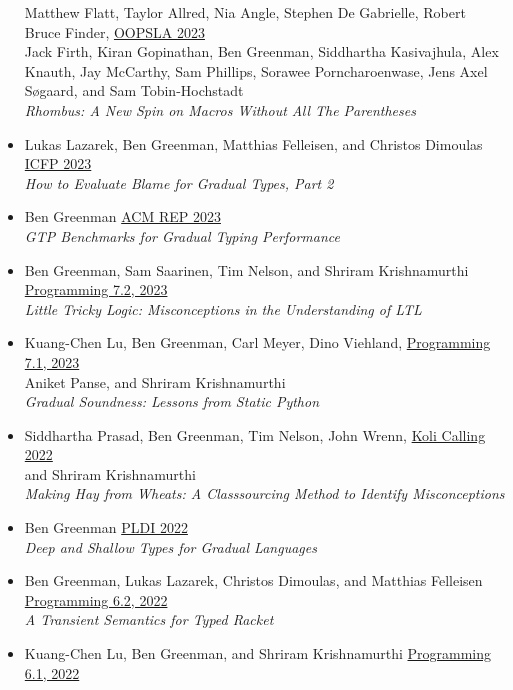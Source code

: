 \documentclass[11pt]{article}
\begin{document}
\begin{itemize}
  Matthew Flatt, Taylor Allred, Nia Angle, Stephen De Gabrielle, Robert Bruce Finder, \hfill \href{https://2023.splashcon.org/track/splash-2023-oopsla}{OOPSLA 2023} \\
  Jack Firth, Kiran Gopinathan, Ben Greenman, Siddhartha Kasivajhula,
  Alex Knauth, Jay McCarthy, Sam Phillips, Sorawee Porncharoenwase, Jens Axel Søgaard, and Sam Tobin-Hochstadt \\
  \emph{Rhombus: A New Spin on Macros Without All The Parentheses}
\item
  Lukas Lazarek, Ben Greenman, Matthias Felleisen, and Christos Dimoulas \hfill \href{https://icfp23.sigplan.org/}{ICFP 2023} \\
  \emph{How to Evaluate Blame for Gradual Types, Part 2}
\item
  Ben Greenman \hfill \href{https://acm-rep.github.io/2023/}{ACM REP 2023} \\
  \emph{GTP Benchmarks for Gradual Typing Performance}
\item
  Ben Greenman, Sam Saarinen, Tim Nelson, and Shriram Krishnamurthi \hfill \href{https://2023.programming-conference.org/}{Programming 7.2, 2023} \\
  \emph{Little Tricky Logic: Misconceptions in the Understanding of LTL}
\item
  Kuang-Chen Lu, Ben Greenman, Carl Meyer, Dino Viehland, \hfill \href{https://2023.programming-conference.org/}{Programming 7.1, 2023} \\
  Aniket Panse, and Shriram Krishnamurthi \\
  \emph{Gradual Soundness: Lessons from Static Python}
\item
  Siddhartha Prasad, Ben Greenman, Tim Nelson, John Wrenn, \hfill \href{https://www.kolicalling.fi/}{Koli Calling 2022} \\
  and Shriram Krishnamurthi \\
  \emph{Making Hay from Wheats: A Classsourcing Method to Identify Misconceptions}
\item
  Ben Greenman \hfill \href{https://pldi22.sigplan.org/}{PLDI 2022} \\
  \emph{Deep and Shallow Types for Gradual Languages}
\item
  Ben Greenman, Lukas Lazarek, Christos Dimoulas, and Matthias Felleisen \hfill \href{https://2022.programming-conference.org/}{Programming 6.2, 2022} \\
  \emph{A Transient Semantics for Typed Racket}
\item
  Kuang-Chen Lu, Ben Greenman, and Shriram Krishnamurthi \hfill \href{https://2022.programming-conference.org/}{Programming 6.1, 2022} \\

\end{itemize}
\end{document}
